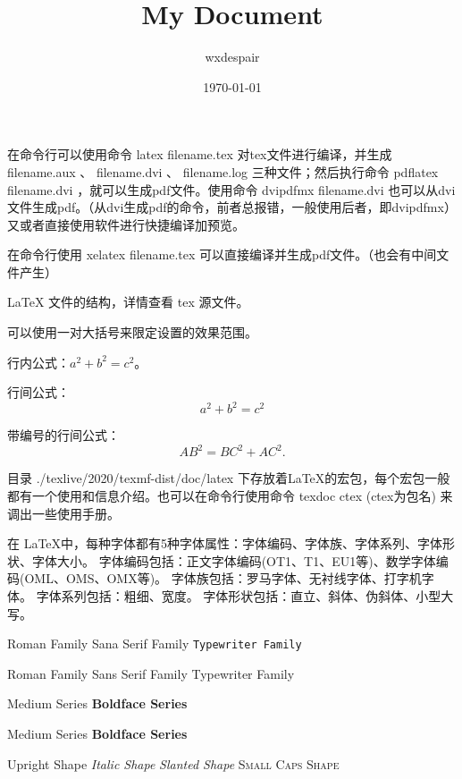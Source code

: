 \documentclass[UTF8]{ctexart}   %
\title{\heiti My Document}      %
\author{wxdespair}              %
\date{\kaishu \today}           %
\begin{document}
    \maketitle          %

    在命令行可以使用命令 latex filename.tex 对tex文件进行编译，并生成 filename.aux 、 filename.dvi 、 filename.log 三种文件；然后执行命令 pdflatex filename.dvi ，就可以生成pdf文件。使用命令 dvipdfmx filename.dvi 也可以从dvi文件生成pdf。（从dvi生成pdf的命令，前者总报错，一般使用后者，即dvipdfmx）又或者直接使用软件进行快捷编译加预览。

    在命令行使用 xelatex filename.tex 可以直接编译并生成pdf文件。（也会有中间文件产生）

    LaTeX 文件的结构，详情查看 tex 源文件。

    可以使用一对大括号来限定设置的效果范围。

    行内公式：$a^2+b^2=c^2$。

    行间公式：$$a^2+b^2=c^2$$

    带编号的行间公式：
    \begin{equation}    %
        AB^2 = BC^2 + AC^2.
    \end{equation}

    目录 {./texlive/2020/texmf-dist/doc/latex} 下存放着LaTeX的宏包，每个宏包一般都有一个使用和信息介绍。也可以在命令行使用命令 texdoc ctex (ctex为包名) 来调出一些使用手册。

    在 \LaTeX 中，每种字体都有5种字体属性：字体编码、字体族、字体系列、字体形状、字体大小。
    字体编码包括：正文字体编码(OT1、T1、EU1等)、数学字体编码(OML、OMS、OMX等)。
    字体族包括：罗马字体、无衬线字体、打字机字体。
    字体系列包括：粗细、宽度。
    字体形状包括：直立、斜体、伪斜体、小型大写。

    \textrm{Roman Family} \textsf{Sana Serif Family} \texttt{Typewriter Family}

    {\rmfamily Roman Family} {\sffamily Sans Serif Family} {\ttfamily Typewriter Family}

    \textmd{Medium Series} \textbf{Boldface Series}

    {\mdseries Medium Series} {\bfseries Boldface Series}

    \textup{Upright Shape} \textit{Italic Shape} \textsl{Slanted Shape} \textsc{Small Caps Shape}
\end{document}
